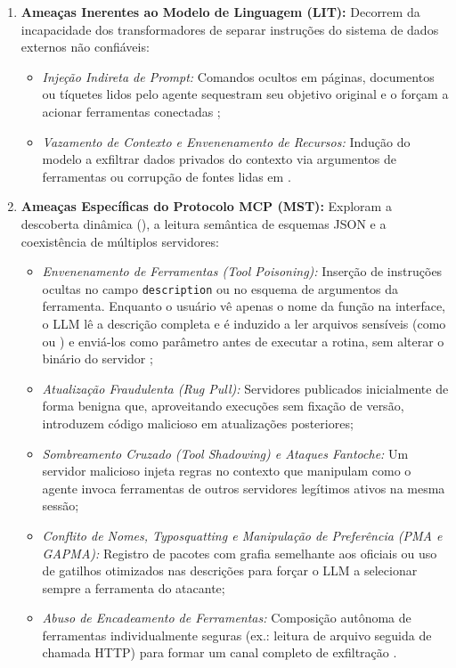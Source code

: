 \begin{enumerate}
  \item \textbf{Ameaças Inerentes ao Modelo de Linguagem (LIT):} Decorrem da incapacidade dos transformadores de separar instruções do sistema de dados externos não confiáveis:
  \begin{itemize}
    \item \textit{Injeção Indireta de Prompt:} Comandos ocultos em páginas, documentos ou tíquetes lidos pelo agente sequestram seu objetivo original e o forçam a acionar ferramentas conectadas \cite{singh2026mcpsecure};
    \item \textit{Vazamento de Contexto e Envenenamento de Recursos:} Indução do modelo a exfiltrar dados privados do contexto via argumentos de ferramentas ou corrupção de fontes lidas em .
  \end{itemize}

  \item \textbf{Ameaças Específicas do Protocolo MCP (MST):} Exploram a descoberta dinâmica (), a leitura semântica de esquemas JSON e a coexistência de múltiplos servidores:
  \begin{itemize}
    \item \textit{Envenenamento de Ferramentas (\textit{Tool Poisoning}):} Inserção de instruções ocultas no campo \texttt{description} ou no esquema de argumentos da ferramenta. Enquanto o usuário vê apenas o nome da função na interface, o LLM lê a descrição completa e é induzido a ler arquivos sensíveis (como  ou ) e enviá-los como parâmetro antes de executar a rotina, sem alterar o binário do servidor \cite{hasan2026mcp};
    \item \textit{Atualização Fraudulenta (\textit{Rug Pull}):} Servidores publicados inicialmente de forma benigna que, aproveitando execuções sem fixação de versão, introduzem código malicioso em atualizações posteriores;
    \item \textit{Sombreamento Cruzado (\textit{Tool Shadowing}) e Ataques Fantoche:} Um servidor malicioso injeta regras no contexto que manipulam como o agente invoca ferramentas de outros servidores legítimos ativos na mesma sessão;
    \item \textit{Conflito de Nomes, \textit{Typosquatting} e Manipulação de Preferência (PMA e GAPMA):} Registro de pacotes com grafia semelhante aos oficiais ou uso de gatilhos otimizados nas descrições para forçar o LLM a selecionar sempre a ferramenta do atacante;
    \item \textit{Abuso de Encadeamento de Ferramentas:} Composição autônoma de ferramentas individualmente seguras (ex.: leitura de arquivo seguida de chamada HTTP) para formar um canal completo de exfiltração \cite{singh2026mcpsecure}.
  \end{itemize}


\end{enumerate}
